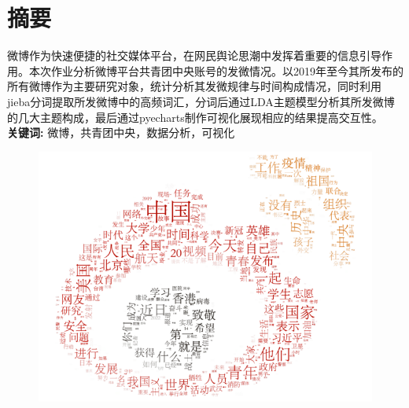 \section*{ \centering \bf 摘要}

\vskip0.5cm
微博作为快速便捷的社交媒体平台，在网民舆论思潮中发挥着重要的信息引导作⽤。本次作业分析微博平台共青团中央账号的发微情况。以2019年至今其所发布的所有微博作为主要研究对象，统计分析其发微规律与时间构成情况，同时利用jieba分词提取所发微博中的高频词汇，分词后通过LDA主题模型分析其所发微博的几大主题构成，最后通过pyecharts制作可视化展现相应的结果提高交互性。
\\[0.4cm]
\textbf{关键词:}  微博，共青团中央，数据分析，可视化 
\\[2cm]
\begin{figure}[H]
    \centering
    \includegraphics[width=12cm]{figure/wordcloudweibo.png}
\end{figure} 

